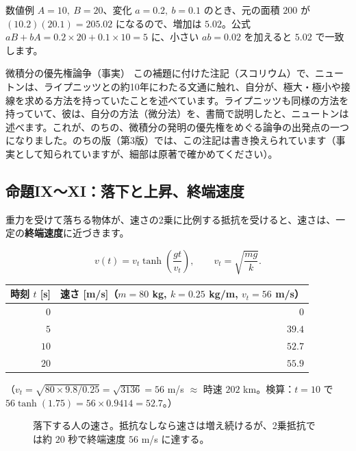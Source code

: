 \documentclass[a4paper,11pt,openany]{ltjsbook}
\begin{document}
\begin{examplebox}{数値例}
$A=10,\ B=20$、変化 $a=0.2,\ b=0.1$ のとき、元の面積 $200$ が $(10.2)(20.1)=205.02$ になるので、増加は $5.02$。公式 $aB+bA=0.2\times20+0.1\times10=5$ に、小さい $ab=0.02$ を加えると $5.02$ で一致します。
\end{examplebox}

\begin{notebox}{微積分の優先権論争（事実）}
この補題に付けた注記（スコリウム）で、ニュートンは、ライプニッツとの約10年にわたる文通に触れ、自分が、極大・極小や接線を求める方法を持っていたことを述べています。ライプニッツも同様の方法を持っていて、彼は、自分の方法（微分法）を、書簡で説明したと、ニュートンは述べます。これが、のちの、微積分の発明の優先権をめぐる論争の出発点の一つになりました。のちの版（第3版）では、この注記は書き換えられています（事実として知られていますが、細部は原著で確かめてください）。
\end{notebox}

\subsection{命題IX〜XI：落下と上昇、終端速度}

重力を受けて落ちる物体が、速さの2乗に比例する抵抗を受けると、速さは、一定の\textbf{終端速度}に近づきます。

\[
v(t)=v_t\tanh\!\left(\frac{gt}{v_t}\right),\qquad v_t=\sqrt{\frac{mg}{k}}.
\]

\begin{center}
\begin{tabular}{rr}
\toprule
時刻 $t$ [s] & 速さ [m/s]（$m=80$ kg, $k=0.25$ kg/m, $v_t=56$ m/s）\\
\midrule
$0$ & $0$\\
$5$ & $39.4$\\
$10$ & $52.7$\\
$20$ & $55.9$\\
\bottomrule
\end{tabular}
\end{center}

（$v_t=\sqrt{80\times9.8/0.25}=\sqrt{3136}=56$ m/s $\approx$ 時速 $202$ km。検算：$t=10$ で $56\tanh(1.75)=56\times0.9414=52.7$。）

\begin{figure}[htbp]
\centering
{}
\caption{落下する人の速さ。抵抗なしなら速さは増え続けるが、2乗抵抗では約 $20$ 秒で終端速度 $56$ m/s に達する。}
\end{figure}
\end{document}
